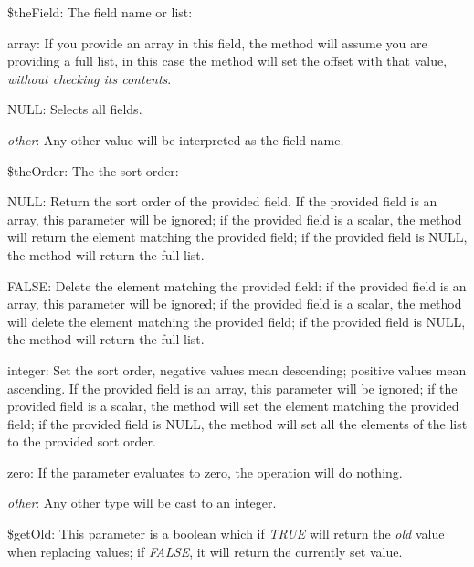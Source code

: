 \begin{DoxyItemize}
\item {\ttfamily \$the\-Field}\-: The field name or list\-: 
\begin{DoxyItemize}
\item {\ttfamily array}\-: If you provide an array in this field, the method will assume you are providing a full list, in this case the method will set the offset with that value, {\itshape without checking its contents}. 
\item {\ttfamily N\-U\-L\-L}\-: Selects all fields. 
\item {\itshape other}\-: Any other value will be interpreted as the field name. 
\end{DoxyItemize}
\item {\ttfamily \$the\-Order}\-: The the sort order\-: 
\begin{DoxyItemize}
\item {\ttfamily N\-U\-L\-L}\-: Return the sort order of the provided field. If the provided field is an array, this parameter will be ignored; if the provided field is a scalar, the method will return the element matching the provided field; if the provided field is {\ttfamily N\-U\-L\-L}, the method will return the full list. 
\item {\ttfamily F\-A\-L\-S\-E}\-: Delete the element matching the provided field\-: if the provided field is an array, this parameter will be ignored; if the provided field is a scalar, the method will delete the element matching the provided field; if the provided field is {\ttfamily N\-U\-L\-L}, the method will return the full list. 
\item {\ttfamily integer}\-: Set the sort order, negative values mean descending; positive values mean ascending. If the provided field is an array, this parameter will be ignored; if the provided field is a scalar, the method will set the element matching the provided field; if the provided field is {\ttfamily N\-U\-L\-L}, the method will set all the elements of the list to the provided sort order. 
\item {\ttfamily zero}\-: If the parameter evaluates to zero, the operation will do nothing. 
\item {\itshape other}\-: Any other type will be cast to an integer. 
\end{DoxyItemize}
\item {\ttfamily \$get\-Old}\-: This parameter is a boolean which if {\itshape T\-R\-U\-E} will return the {\itshape old} value when replacing values; if {\itshape F\-A\-L\-S\-E}, it will return the currently set value. 
\end{DoxyItemize}


